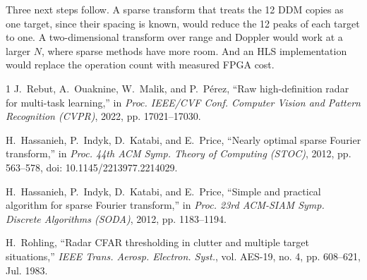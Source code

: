 \documentclass[conference]{IEEEtran}
\begin{document}
Three next steps follow. A sparse transform that treats the 12 DDM copies as one target, since their spacing is known, would reduce the 12 peaks of each target to one. A two-dimensional transform over range and Doppler would work at a larger $N$, where sparse methods have more room. And an HLS implementation would replace the operation count with measured FPGA cost.

\begin{thebibliography}{1}
J.~Rebut, A.~Ouaknine, W.~Malik, and P.~P\'erez, ``Raw high-definition radar for multi-task learning,'' in \emph{Proc. IEEE/CVF Conf. Computer Vision and Pattern Recognition (CVPR)}, 2022, pp. 17021--17030.

H.~Hassanieh, P.~Indyk, D.~Katabi, and E.~Price, ``Nearly optimal sparse Fourier transform,'' in \emph{Proc. 44th ACM Symp. Theory of Computing (STOC)}, 2012, pp. 563--578, doi: 10.1145/2213977.2214029.

H.~Hassanieh, P.~Indyk, D.~Katabi, and E.~Price, ``Simple and practical algorithm for sparse Fourier transform,'' in \emph{Proc. 23rd ACM-SIAM Symp. Discrete Algorithms (SODA)}, 2012, pp. 1183--1194.

H.~Rohling, ``Radar CFAR thresholding in clutter and multiple target situations,'' \emph{IEEE Trans. Aerosp. Electron. Syst.}, vol. AES-19, no. 4, pp. 608--621, Jul. 1983.
\end{thebibliography}
\end{document}
